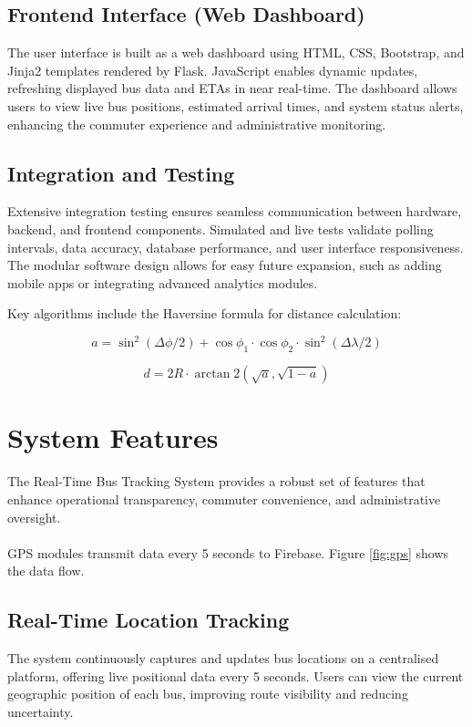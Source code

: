 \documentclass{article}
\begin{document}
\begin{multicols}{2}
\subsection{Frontend Interface (Web Dashboard)}
The user interface is built as a web dashboard using HTML, CSS, Bootstrap, and Jinja2 templates rendered by Flask. JavaScript enables dynamic updates, refreshing displayed bus data and ETAs in near real-time. The dashboard allows users to view live bus positions, estimated arrival times, and system status alerts, enhancing the commuter experience and administrative monitoring.

\subsection{Integration and Testing}
Extensive integration testing ensures seamless communication between hardware, backend, and frontend components. Simulated and live tests validate polling intervals, data accuracy, database performance, and user interface responsiveness. The modular software design allows for easy future expansion, such as adding mobile apps or integrating advanced analytics modules.

\vspace{0.5em}
Key algorithms include the Haversine formula for distance calculation:

\begin{equation}
a = \sin^2(\Delta\phi/2) + \cos\phi_1 \cdot \cos\phi_2 \cdot \sin^2(\Delta\lambda/2)
\end{equation}

\begin{equation}
d = 2R \cdot \arctan2(\sqrt{a}, \sqrt{1-a})
\end{equation}

\columnbreak

\section{System Features}
\vspace{0.5em}
The Real-Time Bus Tracking System provides a robust set of features that enhance operational transparency, commuter convenience, and administrative oversight.\\\\
GPS modules transmit data every 5 seconds to Firebase. Figure \ref{fig:gps} shows the data flow.


\subsection{Real-Time Location Tracking}
The system continuously captures and updates bus locations on a centralised platform, offering live positional data every 5 seconds. Users can view the current geographic position of each bus, improving route visibility and reducing uncertainty.


\end{multicols}
\end{document}
